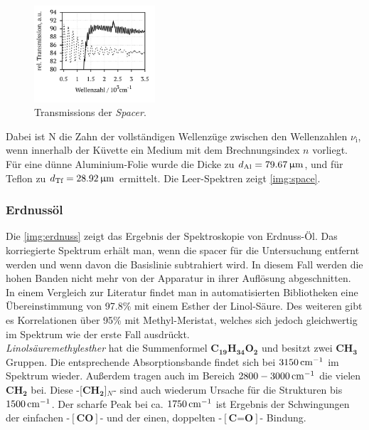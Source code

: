 \documentclass[a4paper,10pt,twocolumn]{article}
\newcommand{\ix}[1]{_\text{#1}}
\newcommand{\tilt}[1]{\textit{#1}}
\newcommand{\fett}[1]{\textbf{#1}}
\begin{document}
		\begin{figure}[h]
			\centering
			\includegraphics[width=0.4\textwidth]{Gruppe2A/spacer.pdf}
			\caption{Transmissions der \tilt{Spacer}.}
			\label{img:space}
		\end{figure}
		
		Dabei ist N die Zahn der vollst\"andigen Wellenz\"uge zwischen den Wellenzahlen $\nu\ix{i}$, wenn innerhalb der K\"uvette ein Medium mit dem Brechnungsindex $n$ vorliegt. F\"ur eine d\"unne Aluminium-Folie wurde die Dicke zu $d\ix{Al}=\unit[79.67]{\upmu m}$, und f\"ur Teflon zu $d\ix{Tf}=\unit[28.92]{\upmu m}$ ermittelt. Die Leer-Spektren zeigt \autoref{img:space}.

		\subsubsection*{Erdnuss\"ol}

		Die \autoref{img:erdnuss} zeigt das Ergebnis der Spektroskopie von Erdnuss-\"Ol. Das korriegierte Spektrum erh\"alt man, wenn die spacer f\"ur die Untersuchung entfernt werden und wenn davon die Basislinie subtrahiert wird. In diesem Fall werden die hohen Banden nicht mehr von der Apparatur in ihrer Aufl\"osung abgeschnitten.\\
		In einem Vergleich zur Literatur findet man in automatisierten Bibliotheken eine \"Ubereinstimmung von 97.8\% mit einem Esther der Linol-S\"aure. Des weiteren gibt es Korrelationen \"uber 95\% mit Methyl-Meristat, welches sich jedoch gleichwertig im Spektrum wie der erste Fall ausdr\"uckt.\\
		\tilt{Linols\"auremethylesther} hat die Summenformel \fett{C}$_{\fett{19}}$\fett{H}$_{\fett{34}}$\fett{O}$_{\fett{2}}$ und besitzt zwei \fett{CH}$_{\fett{3}}$ Gruppen. Die entsprechende Absorptionsbande findet sich bei $\unit[3150]{cm^{-1}}$ im Spektrum wieder. Au{\ss}erdem tragen auch im Bereich $\unit[2800-3000]{cm^{-1}}$ die vielen \fett{CH}$_{\fett{2}}$ bei. Diese -[\fett{CH}$_{\fett{2}}$]$_{N}$- sind auch wiederum Ursache f\"ur die Strukturen bis $\unit[1500]{cm^{-1}}$. Der scharfe Peak bei ca. $\unit[1750]{cm^{-1}}$ ist Ergebnis der Schwingungen der einfachen -$[\fett{CO}]$- und der einen, doppelten -$[\fett{C=O}]$- Bindung.
		
\end{document}
